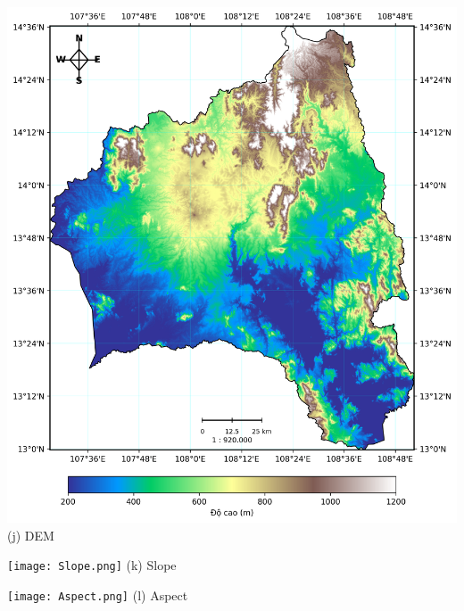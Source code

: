 \documentclass{article}
\begin{document}
\noindent
\begin{minipage}{0.31\textwidth}
    \includegraphics[width=\textwidth]{DEM.png}
    \centering (j) DEM
\end{minipage}%
\hfill
\begin{minipage}{0.31\textwidth}
    \texttt{[image: Slope.png]}
    \centering (k) Slope
\end{minipage}%
\hfill
\begin{minipage}{0.31\textwidth}
    \texttt{[image: Aspect.png]}
    \centering (l) Aspect
\end{minipage}

\vspace{0.5em}
\end{document}
